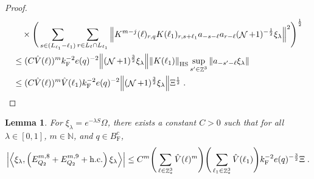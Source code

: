 \documentclass[12pt,a4paper]{article}
\numberwithin{equation}{section}
\newcommand{\NNN}{\mathbb{N}}
\newcommand{\1}{\mathbb{I}}
\newcommand{\F}{\mathrm{F}}
\newcommand{\HS}{\mathrm{HS}}
\DeclareMathOperator{\Z}{\mathbb{Z}}
\DeclareMathOperator{\NN}{\mathcal{N}}
\newcommand{\half}{\frac{1}{2}}
\newcommand{\eva}[1]{\left\langle #1 \right\rangle}
\theoremstyle{plain}
\newtheorem{lemma}[theorem]{Lemma}
\theoremstyle{definition}
\theoremstyle{remark}
\theoremstyle{plain}
\theoremstyle{definition}
\theoremstyle{remark}
\begin{document}
\begin{proof}
\begin{align}
		&\quad \times\Bigg( \sum\limits_{ s \in (L_{\ell_1}-\ell_1)} \sum\limits_{ r\in L_{\ell} \cap L_{\ell_1}}
		\norm{ K^{m-j}(\ell)_{r,q} K(\ell_1)_{r,s+\ell_1} a_{-s-\ell}a_{r-\ell} (\NN+1)^{-\half} \xi_\lambda }^2\Bigg)^\half \nonumber\\
	&\leq (C \hat{V}(\ell))^m k_{\F}^{-2} e(q)^{-2} 
		\norm{(\NN+1)^{\frac 32} \xi_\lambda}
		\norm{K(\ell_1)}_{\HS}
		\sup_{s' \in \Z^3} \norm{ a_{-s'-\ell} \xi_\lambda } \nonumber \\
	&\leq (C \hat{V}(\ell))^m \hat{V}(\ell_1) k_{\F}^{-2} e(q)^{-2}
		\norm{(\NN+1)^{\frac 32} \xi_\lambda} \Xi^{\half} \;.
\end{align} 
\end{proof}


\begin{lemma} \label{lem:EQ218}
For $\xi_\lambda = e^{-\lambda S} \Omega$, there exists a constant $ C > 0 $ such that for all $ \lambda \in [0,1] $, $ m \in \NNN $, and $ q \in B_{\F}^c $,
\begin{align}
	\abs{\eva{\xi_\lambda,\left(E^{m,8}_{Q_2}+E^{m,9}_{Q_2}+\mathrm{h.c.}\right) \xi_\lambda }}
	\leq C^m \Bigg(\sum\limits_{\ell \in \Z^3_*} \hat{V}(\ell)^m \Bigg)
		\Bigg(\sum\limits_{\ell_1 \in \Z^3_*} \hat{V}(\ell_1) \Bigg)
		k_{\F}^{-2} e(q)^{-\frac 32} \Xi \;.\label{eq:estEQ218}
\end{align}
\end{lemma}
\end{document}
